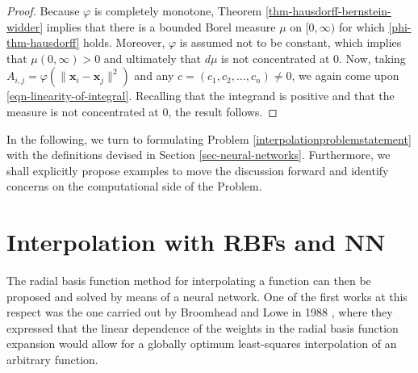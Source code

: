 \documentclass[12pt]{report} %
\newcommand{\tmmathbf}[1]{\ensuremath{\boldsymbol{#1}}}
\begin{document}
\begin{proof}
  Because $\varphi$ is completely monotone, Theorem
  \ref{thm-hausdorff-bernstein-widder} implies that there is a bounded Borel
  measure $\mu$ on $[0, \infty)$ for which \eqref{phi-thm-hausdorff} holds.
  Moreover, $\varphi$ is assumed not to be constant, which implies that $\mu (0,
    \infty) > 0$ and ultimately that $d \mu$ is not concentrated at $0$. Now,
  taking $A_{i, j} = \varphi (\| \tmmathbf{x}_i -\tmmathbf{x}_j \|^2)$ and any
  $c = (c_1, c_2, \ldots, c_n) \neq 0$, we again come upon
  \eqref{eqn-linearity-of-integral}. Recalling that the integrand is positive
  and that the measure is not concentrated at $0$, the result follows.
\end{proof}

In the following, we turn to formulating Problem \ref{interpolationproblemstatement}
with the definitions devised in Section \ref{sec-neural-networks}. Furthermore,
we shall explicitly propose examples to move the discussion forward and identify
concerns on the computational side of the Problem.

\section{Interpolation with RBFs and NN}

The radial basis function method for interpolating a function can then be
proposed and solved by means of a neural network. One of the first works at
this respect was the one carried out by Broomhead and Lowe in 1988
  {\cite{broomhead1988multivariable}}, where they expressed that the linear
dependence of the weights in the radial basis function expansion would allow
for a globally optimum least-squares interpolation of an arbitrary function.
\end{document}
